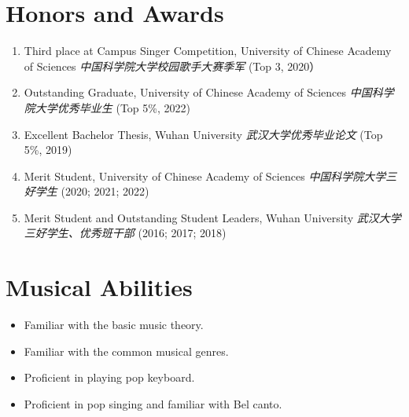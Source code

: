 \documentclass{resume}
\begin{document}
\section{Honors and Awards}
\begin{enumerate}
  \item Third place at Campus Singer Competition, University of Chinese Academy of
        Sciences \textit{中国科学院大学校园歌手大赛季军} (Top 3, 2020）
  \item Outstanding Graduate, University of Chinese Academy of Sciences
        \textit{中国科学院大学优秀毕业生} (Top 5\%, 2022)
  \item Excellent Bachelor Thesis, Wuhan University \textit{武汉大学优秀毕业论文} (Top 5\%, 2019)
  \item Merit Student, University of Chinese Academy of Sciences \textit{中国科学院大学三好学生}
        (2020; 2021; 2022)
  \item Merit Student and Outstanding Student Leaders, Wuhan University
        \textit{武汉大学三好学生、优秀班干部} (2016; 2017; 2018)
\end{enumerate}

\section{Musical Abilities}
\begin{itemize}
  \item Familiar with the basic music theory.
  \item Familiar with the common musical genres.
  \item Proficient in playing pop keyboard.
  \item Proficient in pop singing and familiar with Bel canto.
\end{itemize}
\end{document}

